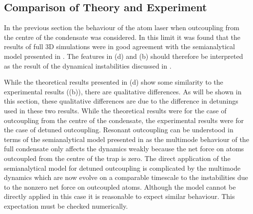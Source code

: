 \subsection{Comparison of Theory and Experiment}

In the previous section the behaviour of the atom laser when outcoupling from the centre of the condensate was considered.  In this limit it was found that the results of full 3D simulations were in good agreement with the semianalytical model presented in .  The features in (d) and (b) should therefore be interpreted as the result of the dynamical instabilities discussed in . 

While the theoretical results presented in (d) show some similarity to the experimental results ((b)), there are qualitative differences.  As will be shown in this section, these qualitative differences are due to the difference in detunings used in these two results.  While the theoretical results were for the case of outcoupling from the centre of the condensate, the experimental results were for the case of detuned outcoupling.  Resonant outcoupling can be understood in terms of the semianalytical model presented in  as the multimode behaviour of the full condensate only affects the dynamics weakly because the net force on atoms outcoupled from the centre of the trap is zero.  The direct application of the semianalytical model for detuned outcoupling is complicated by the multimode dynamics which are now evolve on a comparable timescale to the instabilities due to the nonzero net force on outcoupled atoms.  Although the model cannot be directly applied in this case it is reasonable to expect similar behaviour.  This expectation must be checked numerically.

